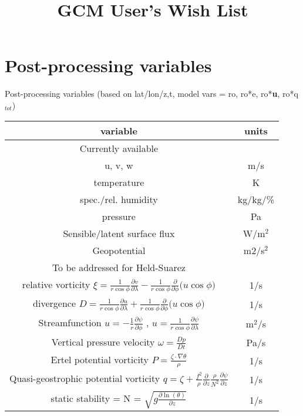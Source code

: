 \documentclass{report}
\title{GCM User's Wish List}
\author{ }
\begin{document}
\maketitle

\section{Post-processing variables}\label{}

Post-processing variables (based on lat/lon/z,t, model vars = ro, ro*e, ro*\textbf{u}, ro*q$_{tot}$)

\begin{center}
\begin{tabular}{ |c|c| } 
 \hline
\textbf{ variable  }                   & \textbf{units}  \\ 
 \hline
 Currently available & \\
 \hline
 u, v, w                      & m/s  \\ 
 temperature                  & K \\ 
 spec./rel. humidity          &  kg/kg/\% \\
 pressure                     & Pa \\ 
 Sensible/latent surface flux & W/m$^2$ \\
 Geopotential                 & m2/s$^2$ \\
 \hline
 To be addressed for Held-Suarez& \\
 \hline
 relative vorticity $ \xi=\frac{1}{r \cos \phi}\frac{\partial v}{\partial \lambda} - \frac{1}{r \cos \phi} \frac{\partial}{\partial \phi}\Big( u \cos \phi \Big)$ & 1/s \\
 divergence $D = \frac{1}{r \cos \phi}\frac{\partial u}{\partial \lambda} + \frac{1}{r \cos \phi} \frac{\partial}{\partial \phi}\Big( u \cos \phi \Big)$      & 1/s \\ 
 Streamfunction $ u = -\frac{1}{r} \frac{\partial \psi}{ \partial \phi} $ ,    $ u = \frac{1}{r \cos \phi} \frac{\partial \psi}{ \partial \lambda} $           & m$^2$/s \\
 Vertical pressure velocity $\omega = \frac{D p}{Dt}$                        & Pa/s \\
 Ertel potential vorticity $P = \frac{\zeta \cdot \nabla\theta}{\rho}$ & 1/s\\
 Quasi-geostrophic potential vorticity $q = \zeta + \frac{f^2}{\rho}\frac{\partial}{\partial z}\frac{\rho}{N^2}\frac{\partial \psi}{ \partial z} $          & 1/s \\
  static stability = N = $\sqrt{g\frac{\partial \ln(\theta)}{\partial z}}$ & 1/s\\

\end{tabular}
\end{center}
\end{document}
